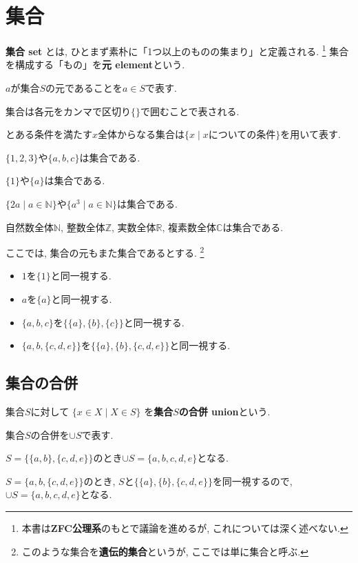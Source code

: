 \section{集合}
{\bf 集合 set}
とは, ひとまず素朴に「1つ以上のものの集まり」と定義される.
\footnote{本書は{\bf ZFC公理系}のもとで議論を進めるが, これについては深く述べない.} 
集合を構成する「もの」を{\bf 元 element}という.
\begin{Notation}
$a$が集合$S$の元であることを$a\in S$で表す.
\end{Notation}
\begin{Notation}
集合は各元をカンマで区切り$\{\}$で囲むことで表される. 
\end{Notation}
\begin{Notation}
とある条件を満たす$x$全体からなる集合は$\{x\mid x\text{についての条件}\}$を用いて表す.
\end{Notation}
\begin{example}$\{1,2,3\}$や$\{a,b,c\}$は集合である. 
\end{example}
\begin{example}$\{1\}$や$\{a\}$は集合である. 
\end{example}
\begin{example}
$\{2a\mid a\in\mathbb{N}\}$や$\{a^3\mid a\in\mathbb{N}\}$は集合である.
\end{example}

\begin{example}
自然数全体$\mathbb{N}$, 整数全体$\mathbb{Z}$, 実数全体$\mathbb{R}$, 複素数全体$\mathbb{C}$は集合である.
\end{example}
\begin{caution}
ここでは, 集合の元もまた集合であるとする.
\footnote{このような集合を{\bf 遺伝的集合}というが, ここでは単に集合と呼ぶ.} 
\begin{itemize}
\item 
$1$を$\{1\}$と同一視する.
\item 
$a$を$\{a\}$と同一視する.
\item
$\{a,b,c\}$を$\{\{a\},\{b\},\{c\}\}$と同一視する.
\item 
$\{a,b,\{c,d,e\}\}$を$\{\{a\},\{b\},\{c,d,e\}\}$と同一視する.
\end{itemize}
\end{caution}
\subsection{集合の合併}
\begin{Def}
集合$S$に対して
$\{x\in X\mid X\in S\}$
を{\bf 集合$S$の合併 union}という.
\end{Def}
\begin{Notation}
集合$S$の合併を$\cup S$で表す.
\end{Notation}
\begin{example}
$S=\{\{a,b\},\{c,d,e\}\}$のとき$\cup S=\{a,b,c,d,e\}$となる.
\end{example}
\begin{example}
$S=\{a,b,\{c,d,e\}\}$のとき, $S$と$\{\{a\},\{b\},\{c,d,e\}\}$を同一視するので,
$\cup S=\{a,b,c,d,e\}$となる.
\end{example}
